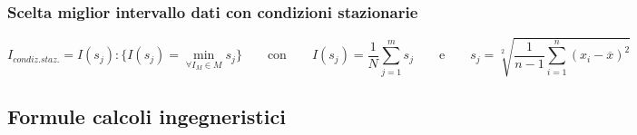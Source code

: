 \documentclass[a4paper,10pt]{article}                                                                                       %
\begin{document}
\subsubsection{Scelta miglior intervallo dati con condizioni stazionarie}                                                   %
\label{subsubsec:daf_interv}                                                                                                %
\begin{equation}                                                                                                            %
  I_{condiz.staz.} = I(s_j) : \{I(s_j) = \min_{\forall I_M \in M} s_j\}                                                     %
  \qquad\text{con}\qquad                                                                                                    %
  I(s_j) = \frac{1}{N}\sum_{j=1}^{m}{s_j}                                                                                   %
  \qquad\text{e}\qquad                                                                                                      %
  s_j = \sqrt[2]{\frac{1}{n-1}\sum_{i=1}^{n}(x_i-\overline{x})^2}                                                           %
  \label{eqn:stat}                                                                                                          %
\end{equation}                                                                                                              %
\subsection{Formule calcoli ingegneristici}                                                                                 %
\label{subsec:ec_formulas}                                                                                                  %
\end{document}
